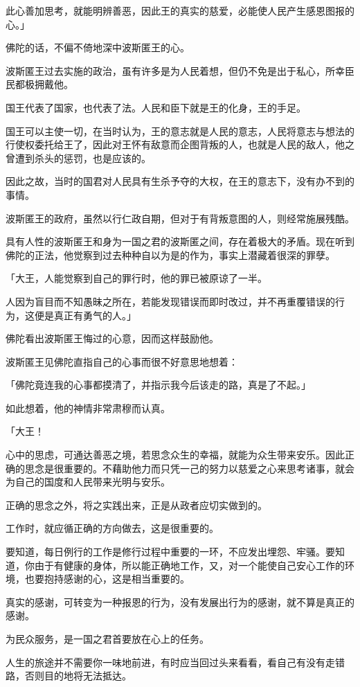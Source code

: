 \documentclass[twoside,openany]{book}
\begin{document}
此心善加思考，就能明辨善恶，因此王的真实的慈爱，必能使人民产生感恩图报的心。」

佛陀的话，不偏不倚地深中波斯匿王的心。

波斯匿王过去实施的政治，虽有许多是为人民着想，但仍不免是出于私心，所幸臣民都极拥戴他。

国王代表了国家，也代表了法。人民和臣下就是王的化身，王的手足。

国王可以主使一切，在当时认为，王的意志就是人民的意志，人民将意志与想法的行使权委托给王了，因此对王怀有敌意而企图背叛的人，也就是人民的敌人，他之曾遭到杀头的惩罚，也是应该的。

因此之故，当时的国君对人民具有生杀予夺的大权，在王的意志下，没有办不到的事情。

波斯匿王的政府，虽然以行仁政自期，但对于有背叛意图的人，则经常施展残酷。

具有人性的波斯匿王和身为一国之君的波斯匿之间，存在着极大的矛盾。现在听到佛陀的正法，他觉察到过去种种自以为是的作为，事实上潜藏着很深的罪孽。

「大王，人能觉察到自己的罪行时，他的罪已被原谅了一半。

人因为盲目而不知愚昧之所在，若能发现错误而即时改过，并不再重覆错误的行为，这便是真正有勇气的人。」

佛陀看出波斯匿王悔过的心意，因而这样鼓励他。

波斯匿王见佛陀直指自己的心事而很不好意思地想着：

「佛陀竟连我的心事都摸清了，并指示我今后该走的路，真是了不起。」

如此想着，他的神情非常肃穆而认真。

「大王！

心中的思虑，可通达善恶之境，若思念众生的幸福，就能为众生带来安乐。因此正确的思念是很重要的。不藉助他力而只凭一己的努力以慈爱之心来思考诸事，就会为自己的国度和人民带来光明与安乐。

正确的思念之外，将之实践出来，正是从政者应切实做到的。

工作时，就应循正确的方向做去，这是很重要的。

要知道，每日例行的工作是修行过程中重要的一环，不应发出埋怨、牢骚。要知道，你由于有健康的身体，所以能正确地工作，又，对一个能使自己安心工作的环境，也要抱持感谢的心，这是相当重要的。

真实的感谢，可转变为一种报恩的行为，没有发展出行为的感谢，就不算是真正的感谢。

为民众服务，是一国之君首要放在心上的任务。

人生的旅途并不需要你一味地前进，有时应当回过头来看看，看自己有没有走错路，否则目的地将无法抵达。
\end{document}
